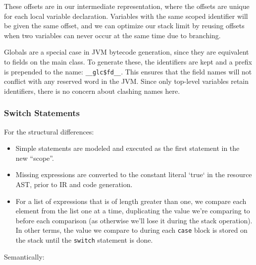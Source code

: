 \documentclass[11pt]{article}
\begin{document}
These offsets are in our intermediate representation, where
the offsets are unique for each local variable declaration. Variables with
the same scoped identifier will be given the same offset, and we can
optimize our stack limit by reusing offsets when two variables can
never occur at the same time due to branching.

Globals are a special case in JVM bytecode generation, since they are
equivalent to fields on the main class. To generate these, the identifiers
are kept and a prefix is prepended to the name: \texttt{\_\_glc\$fd\_\_}. This
ensures that the field names will not conflict with any reserved word in
the JVM. Since only top-level variables retain identifiers, there is no
concern about clashing names here.

\subsubsection{Switch Statements}
\label{sec:switch-stmts-codegen}
For the structural differences:
\begin{itemize}
\item Simple statements are modeled and executed as the first
  statement in the new ``scope''.
\item Missing expressions are converted to the constant literal
  `true` in the resource AST, prior to IR and code generation.
\item For a list of expressions that is of length greater than one, we
  compare each element from the list one at a time, duplicating
  the value we're comparing to before each comparison (as otherwise
  we'll lose it during the stack operation). In other terms, the value
  we compare to during each \texttt{case} block is stored on the stack
  until the \texttt{switch} statement is done.
\end{itemize}

\noindent Semantically:
\end{document}
